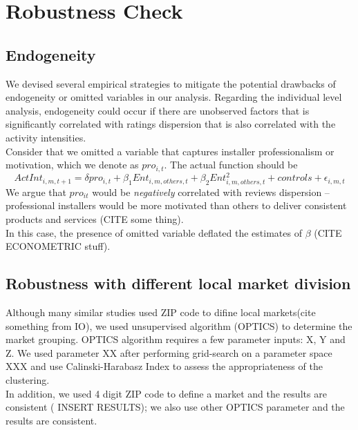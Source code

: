 \documentclass[msom,blindrev]{informs3}
\begin{document}
\section{Robustness Check}
\subsection{Endogeneity}

We devised several empirical strategies to mitigate the potential drawbacks of endogeneity or omitted variables in our analysis. Regarding the individual level analysis, endogeneity could occur if there are unobserved factors that is significantly correlated with ratings dispersion that is also correlated with the activity intensities.\\
Consider that we omitted a variable that captures installer professionalism or motivation, which we denote as $pro_{i,t}$. The actual function should be
\begin{equation}
ActInt_{i,m,t+1}=\delta pro_{i,t}+\beta_{1} Ent_{i,m,others,t}+\beta_{2}Ent_{i,m,others,t}^2+controls+\epsilon_{i,m,t}
\end{equation}
We argue that $pro_{it}$ would be \textit{negatively} correlated with reviews dispersion -- professional installers would be more motivated than others to deliver consistent products and services (CITE some thing).  \\

In this case, the presence of omitted variable deflated the estimates of $\beta$ (CITE ECONOMETRIC stuff). \\


\subsection{Robustness with different local market division}
Although many similar studies used ZIP code to difine local markets(cite something from IO), we used unsupervised algorithm (OPTICS) to determine the market grouping. OPTICS algorithm requires a few parameter inputs: X, Y and Z. We used parameter XX after performing grid-search on a parameter space XXX and use Calinski-Harabasz Index to assess the appropriateness of the clustering.  \\ In addition, we used 4 digit ZIP code to define a market and the results are consistent ( INSERT RESULTS); we also use other OPTICS parameter and the results are consistent.  \\
\end{document}
